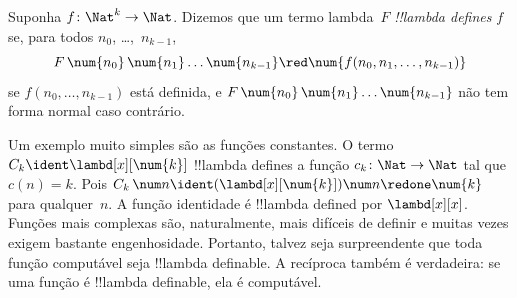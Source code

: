 \documentclass[../../../include/open-logic-section]{subfiles}
\begin{document}
\begin{defn}
Suponha $f\colon \Nat^k \to \Nat$. Dizemos que um termo lambda~$F$
\emph{!!{lambda define}s} $f$ se, para todos
$n_0$, \dots,~$n_{k-1}$,
\[
F \, \num{n_0} \, \num{n_1} \dots \num{n_{k-1}} \red \num{f(n_0, n_1, \dots,
  n_{k-1})}
\]
se $f(n_0, \dots, n_{k-1})$ está definida, e $F \, \num{n_0} \,
\num{n_1} \dots \num{n_{k-1}}$ não tem forma normal caso contrário.
\end{defn}

Um exemplo muito simples são as funções constantes. O termo $C_k \ident
\lambd[x][\num{k}]$ !!{lambda define}s a função $c_k\colon \Nat \to
\Nat$ tal que $c(n) = k$. Pois $C_k \, \num n \ident
(\lambd[x][\num{k}])\num n \redone \num{k}$ para qualquer~$n$. A função
identidade é !!{lambda defined} por $\lambd[x][x]$. Funções mais complexas
são, naturalmente, mais difíceis de definir e muitas vezes exigem bastante
engenhosidade. Portanto, talvez seja surpreendente que toda função
computável seja !!{lambda definable}. A recíproca também é verdadeira: se
uma função é !!{lambda definable}, ela é computável.
\end{document}
